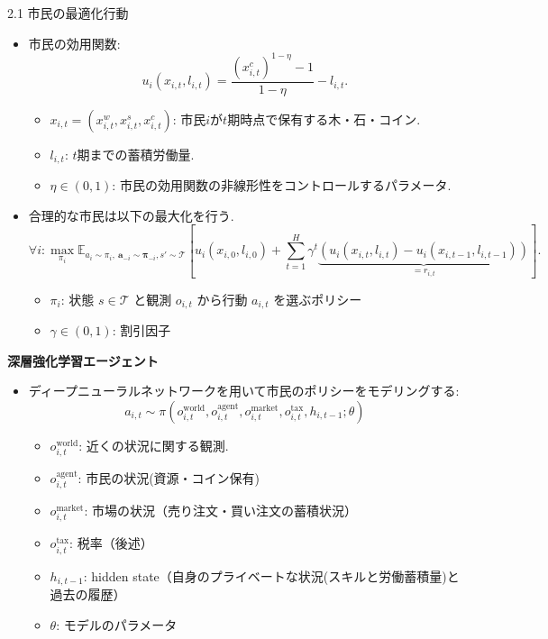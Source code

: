 \documentclass[unicode,aspectratio=169,11pt]{beamer}
\begin{document}
\begin{frame}{2.1 市民の最適化行動}{}
    \begin{itemize}
        \item 市民の効用関数:
        \[
            u_i(x_{i,t}, l_{i,t}) = \frac{(x_{i,t}^{c})^{1-\eta} - 1}{1-\eta} - l_{i,t}.
            \tag{2}
        \]
        \begin{itemize}
            \item $x_{i,t} = (x_{i,t}^w, x_{i,t}^s, x_{i,t}^c)$: 市民$i$が$t$期時点で保有する木・石・コイン.
            \item $l_{i,t}$: $t$期までの蓄積労働量.
            \item $\eta \in (0, 1)$: 市民の効用関数の非線形性をコントロールするパラメータ.
        \end{itemize}
        \item 合理的な市民は以下の最大化を行う.
        \[
            \forall i : \max_{\pi_i} \mathbb{E}_{a_i \sim \pi_i,\ \bm{a}_{-i}\sim \bm{\pi}_{-i}, s'\sim \mathscr{T}}
            \left[u_i(x_{i,0}, l_{i,0}) + \sum_{t=1}^H\gamma^t \underbrace{\left(u_i(x_{i,t}, l_{i,t})-u_i(x_{i,t-1}, l_{i,t-1})\right)}_{=r_{i,t}}\right].
            \tag{3}
        \]
        \begin{itemize}
            \item $\pi_i$: 状態 $s \in \mathscr{T}$ と観測 $o_{i,t}$ から行動 $a_{i,t}$ を選ぶポリシー
            \item $\gamma \in (0, 1)$: 割引因子
        \end{itemize}
    \end{itemize}
\end{frame}

\begin{frame}{}{}
{\bf 深層強化学習エージェント}
\begin{itemize}
    \item ディープニューラルネットワークを用いて市民のポリシーをモデリングする:
    \[ a_{i,t} \sim \pi(o^{\mathrm{world}}_{i,t}, o^{\mathrm{agent}}_{i,t}, o^{\mathrm{market}}_{i,t}, o^{\mathrm{tax}}_{i,t}, h_{i,t-1};\theta) \]
    \begin{itemize}
        \item $o^{\mathrm{world}}_{i,t}$: 近くの状況に関する観測.
        \item $o^{\mathrm{agent}}_{i,t}$: 市民の状況(資源・コイン保有)
        \item $o^{\mathrm{market}}_{i,t}$: 市場の状況（売り注文・買い注文の蓄積状況）
        \item $o^{\mathrm{tax}}_{i,t}$: 税率（後述）
        \item $h_{i, t-1}$: hidden state（自身のプライベートな状況(スキルと労働蓄積量)と過去の履歴）
        \item $\theta$: モデルのパラメータ
    \end{itemize}
\end{itemize}
\end{frame}
\end{document}

